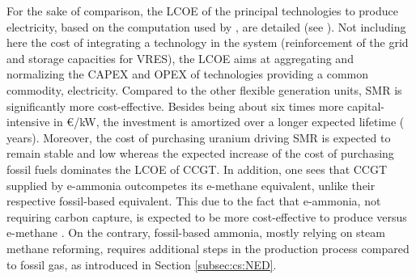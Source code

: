 %

For the sake of comparison, the \gls{LCOE} of the principal technologies to produce electricity, based on the computation used by \citet{limpens2021generating}, are detailed (see ). Not including here the cost of integrating a technology in the system (\eg reinforcement of the grid and storage capacities for \gls{VRES}), the \gls{LCOE} aims at aggregating and normalizing the CAPEX and OPEX of technologies providing a common commodity, \ie electricity. Compared to the other flexible generation units, \gls{SMR} is significantly more cost-effective. Besides being about six times more capital-intensive in €/kW, the investment is amortized over a longer expected lifetime ( years). Moreover, the cost of purchasing uranium driving \gls{SMR} is expected to remain stable and low whereas the expected increase of the cost of purchasing fossil fuels dominates the \gls{LCOE} of \gls{CCGT}. In addition, one sees that \gls{CCGT} supplied by e-ammonia outcompetes its e-methane equivalent, unlike their respective fossil-based equivalent. This due to the fact that e-ammonia, not requiring carbon capture, is expected to be more cost-effective to produce versus e-methane \cite{h2coalition}. On the contrary, fossil-based ammonia, mostly relying on steam methane reforming, requires additional steps in the production process compared to fossil gas, as introduced in Section \ref{subsec:cs:NED}.

